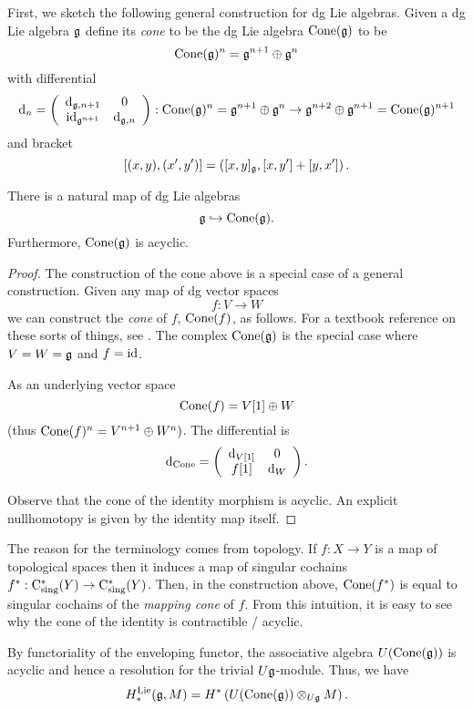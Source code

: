 \documentclass[11pt]{amsart}
\begin{document}
First, we sketch the following general construction for dg Lie algebras.
Given a dg Lie algebra $\mathfrak g$ define its {\em cone} to be the dg Lie algebra ${\rm Cone}(\mathfrak g)$ to be
\[
{\rm Cone}(\mathfrak g)^n = \mathfrak g^{n+1} \oplus \mathfrak g^n
\]
with differential
\[
{\rm d}_n = \left(\begin{array}{cc} {\rm d}_{\mathfrak g,n+1} & 0 \\ {\rm id}_{\mathfrak g^{n+1}}  & {\rm d}_{\mathfrak g, n} \end{array}\right) : {\rm Cone}(\mathfrak g)^{n} = \mathfrak g^{n+1} \oplus \mathfrak g^{n} \to \mathfrak g^{n+2} \oplus \mathfrak g^{n+1} = {\rm Cone}(\mathfrak g)^{n+1}
\]
and bracket
\[
[(x,y), (x',y')] = \left([x,y]_{\mathfrak g}, [x,y'] + [y,x']\right) .
\]

\begin{lem}
There is a natural map of dg Lie algebras
\[
\mathfrak g \hookrightarrow {\rm Cone}(\mathfrak g) .
\]
Furthermore, ${\rm Cone}(\mathfrak g)$ is acyclic.
\end{lem} 
\begin{proof}
The construction of the cone above is a special case of a general construction. 
Given any map of dg vector spaces
\[
f : V \to W
\]
we can construct the {\em cone} of $f$, ${\rm Cone}(f)$, as follows. 
For a textbook reference on these sorts of things, see \cite{Weibel}. 
The complex ${\rm Cone}(\mathfrak g)$ is the special case where $V = W = \mathfrak g$ and $f = {\rm id}$. 

As an underlying vector space
\[
{\rm Cone}(f) = V[1] \oplus W
\]
(thus ${\rm Cone}(f)^n = V^{n+1} \oplus W^n)$. 
The differential is
\[
{\rm d}_{{\rm Cone}} =  \left(\begin{array}{cc} {\rm d}_{V[1]} & 0 \\ f[1]  & {\rm d}_W \end{array}\right) .
\]

Observe that the cone of the identity morphism is acyclic.
An explicit nullhomotopy is given by the identity map itself. 
\end{proof}

\begin{rmk}
The reason for the terminology comes from topology. 
If $f : X \to Y$ is a map of topological spaces then it induces a map of singular cochains $f^* : {\rm C}_{\rm sing}^*(Y) \to {\rm C}_{\rm sing}^*(Y)$. 
Then, in the construction above, ${\rm Cone}(f^*)$ is equal to singular cochains of the {\em mapping cone} of $f$.
From this intuition, it is easy to see why the cone of the identity is contractible / acyclic. 
\end{rmk}

By functoriality of the enveloping functor, the associative algebra $U({\rm Cone}(\mathfrak g))$ is acyclic and hence a resolution for the trivial $U \mathfrak g$-module.
Thus, we have
\[
H^{\rm Lie}_*(\mathfrak g, M) = H^*\left(U({\rm Cone}(\mathfrak g)) \otimes_{U \mathfrak g} M \right) .
\] 
\end{document}
